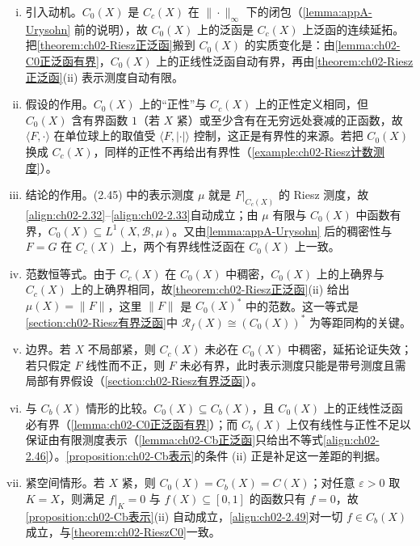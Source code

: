 \documentclass[../../main.tex]{subfiles}%
\begin{document}
\begin{remark}\label{remark:ch02-RieszC0动机}
\begin{enumerate}[(i)]
\item 引入动机。$C_0(X)$ 是 $C_c(X)$ 在 $\|\cdot\|_\infty$ 下的闭包（\cref{lemma:appA-Urysohn} 前的说明），故 $C_0(X)$ 上的泛函是 $C_c(X)$ 上泛函的连续延拓。把\cref{theorem:ch02-Riesz正泛函}搬到 $C_0(X)$ 的实质变化是：由\cref{lemma:ch02-C0正泛函有界}，$C_0(X)$ 上的正线性泛函自动有界，再由\cref{theorem:ch02-Riesz正泛函}(ii) 表示测度自动有限。
\item 假设的作用。$C_0(X)$ 上的“正性”与 $C_c(X)$ 上的正性定义相同，但 $C_0(X)$ 含有界函数 $1$（若 $X$ 紧）或至少含有在无穷远处衰减的正函数，故 $\langle F,\cdot\rangle$ 在单位球上的取值受 $\langle F,|\cdot|\rangle$ 控制，这正是有界性的来源。若把 $C_0(X)$ 换成 $C_c(X)$，同样的正性不再给出有界性（\cref{example:ch02-Riesz计数测度}）。
\item 结论的作用。(2.45) 中的表示测度 $\mu$ 就是 $F|_{C_c(X)}$ 的 Riesz 测度，故\eqref{align:ch02-2.32}--\eqref{align:ch02-2.33}自动成立；由 $\mu$ 有限与 $C_0(X)$ 中函数有界，$C_0(X)\subseteq L^1(X,\mathscr B,\mu)$。又由\cref{lemma:appA-Urysohn} 后的稠密性与 $F=G$ 在 $C_c(X)$ 上，两个有界线性泛函在 $C_0(X)$ 上一致。
\item 范数恒等式。由于 $C_c(X)$ 在 $C_0(X)$ 中稠密，$C_0(X)$ 上的上确界与 $C_c(X)$ 上的上确界相同，故\cref{theorem:ch02-Riesz正泛函}(ii) 给出 $\mu(X)=\|F\|$，这里 $\|F\|$ 是 $C_0(X)^*$ 中的范数。这一等式是\cref{section:ch02-Riesz有界泛函}中 $\mathscr R_f(X)\cong(C_0(X))^*$ 为等距同构的关键。
\item 边界。若 $X$ 不局部紧，则 $C_c(X)$ 未必在 $C_0(X)$ 中稠密，延拓论证失效；若只假定 $F$ 线性而不正，则 $F$ 未必有界，此时表示测度只能是带号测度且需局部有界假设（\cref{section:ch02-Riesz有界泛函}）。
\item 与 $C_b(X)$ 情形的比较。$C_0(X)\subseteq C_b(X)$，且 $C_0(X)$ 上的正线性泛函必有界（\cref{lemma:ch02-C0正泛函有界}）；而 $C_b(X)$ 上仅有线性与正性不足以保证由有限测度表示（\cref{lemma:ch02-Cb正泛函}只给出不等式\eqref{align:ch02-2.46}）。\cref{proposition:ch02-Cb表示}的条件 (ii) 正是补足这一差距的判据。
\item 紧空间情形。若 $X$ 紧，则 $C_0(X)=C_b(X)=C(X)$；对任意 $\varepsilon>0$ 取 $K=X$，则满足 $f|_K=0$ 与 $f(X)\subseteq[0,1]$ 的函数只有 $f=0$，故\cref{proposition:ch02-Cb表示}(ii) 自动成立，\eqref{align:ch02-2.49}对一切 $f\in C_b(X)$ 成立，与\cref{theorem:ch02-RieszC0}一致。
\end{enumerate}
\end{remark}
\end{document}
